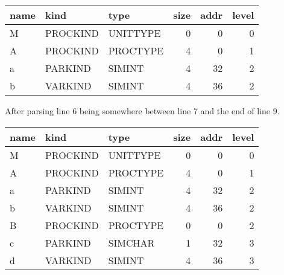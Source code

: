 \begin{tabular}{lllrrr}
name & kind & type & size & addr & level \\
\hline
M & PROCKIND & UNITTYPE & 0 & 0 & 0 \\
A & PROCKIND & PROCTYPE & 4 & 0 & 1 \\
a & PARKIND & SIMINT & 4 & 32 & 2 \\
b & VARKIND & SIMINT & 4 & 36 & 2
\end{tabular}

After parsing line 6 being somewhere between line 7 and the end of line 9.

\begin{tabular}{lllrrr}
name & kind & type & size & addr & level \\
\hline
M & PROCKIND & UNITTYPE & 0 & 0 & 0 \\
A & PROCKIND & PROCTYPE & 4 & 0 & 1 \\
a & PARKIND & SIMINT & 4 & 32 & 2 \\
b & VARKIND & SIMINT & 4 & 36 & 2 \\
B & PROCKIND & PROCTYPE & 0 & 0 & 2 \\
c & PARKIND & SIMCHAR & 1 & 32 & 3 \\
d & VARKIND & SIMINT & 4 & 36 & 3
\end{tabular}

